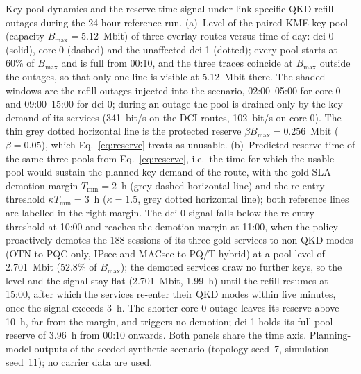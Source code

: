 Key-pool dynamics and the reserve-time signal under link-specific QKD
refill outages during the 24-hour reference run. (a)~Level of the paired-KME
key pool (capacity $B_{\max} = 5.12$~Mbit) of three overlay routes versus
time of day: dci-0 (solid), core-0 (dashed) and the unaffected dci-1
(dotted); every pool starts at 60\% of $B_{\max}$ and is full from 00:10,
and the three traces coincide at $B_{\max}$ outside the outages, so that only
one line is visible at 5.12~Mbit there. The shaded windows are the refill
outages injected into the scenario, 02:00--05:00 for core-0 and 09:00--15:00
for dci-0; during an outage the pool is drained only by the key demand of its
services (341~bit/s on the DCI routes, 102~bit/s on core-0). The thin grey
dotted horizontal line is the protected reserve $\beta B_{\max} = 0.256$~Mbit
($\beta = 0.05$), which Eq.~\eqref{eq:reserve} treats as unusable.
(b)~Predicted reserve time of the same three pools from
Eq.~\eqref{eq:reserve}, i.e.\ the time for which the usable pool would
sustain the planned key demand of the route, with the gold-SLA demotion
margin $T_{\min} = 2$~h (grey dashed horizontal line) and the re-entry
threshold $\kappa T_{\min} = 3$~h ($\kappa = 1.5$, grey dotted horizontal
line); both reference lines are labelled in the right margin. The dci-0
signal falls below the re-entry threshold at 10:00 and reaches the demotion
margin at 11:00, when the policy proactively demotes the 188 sessions of its
three gold services to non-QKD modes (OTN to PQC only, IPsec and MACsec to
PQ/T hybrid) at a pool level of 2.701~Mbit (52.8\% of $B_{\max}$); the
demoted services draw no further keys, so the level and the signal stay flat
(2.701~Mbit, 1.99~h) until the refill resumes at 15:00, after which the
services re-enter their QKD modes within five minutes, once the signal
exceeds 3~h. The shorter core-0 outage leaves its reserve above 10~h, far
from the margin, and triggers no demotion; dci-1 holds its full-pool reserve
of 3.96~h from 00:10 onwards. Both panels share the time axis. Planning-model
outputs of the seeded synthetic scenario (topology seed~7, simulation
seed~11); no carrier data are used.
